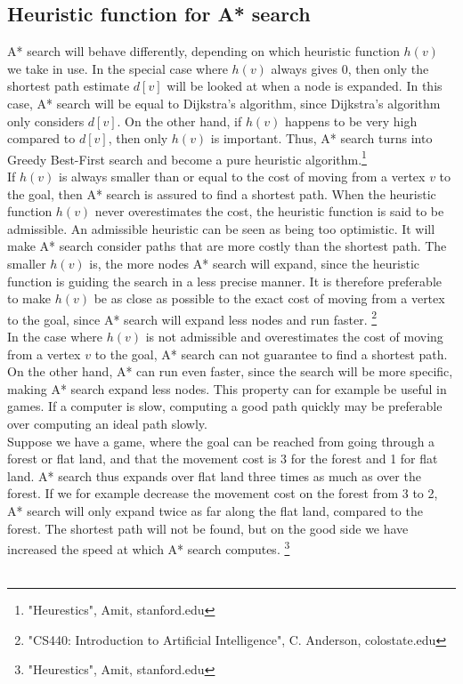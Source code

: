 \documentclass[11pt]{article}
\begin{document}
\subsection{Heuristic function for A* search}
A* search will behave differently, depending on which heuristic function $h(v)$ we take in use. In the special case where $h(v)$ always gives 0, then only the shortest path estimate $d[v]$ will be looked at when a node is expanded. In this case, A* search will be equal to Dijkstra's algorithm, since Dijkstra's algorithm only considers $d[v]$. On the other hand, if $h(v)$ happens to be very high compared to $d[v]$, then only $h(v)$ is important. Thus, A* search turns into Greedy Best-First search and become a pure heuristic algorithm.\footnote{"Heurestics", Amit, stanford.edu}\\

\noindent If $h(v)$ is always smaller than or equal to the cost of moving from a vertex $v$ to the goal, then A* search is assured to find a shortest path. When the  heuristic function $h(v)$ never overestimates the cost, the heuristic function is said to be admissible. An admissible heuristic can be seen as being too optimistic. It will make A* search consider paths that are more costly than the shortest path. The smaller $h(v)$ is, the more nodes A* search will expand, since the heuristic function is guiding the search in a less precise manner. It is therefore preferable to make $h(v)$ be as close as possible to the exact cost of moving from a vertex to the goal, since A* search will expand less nodes and run faster. \footnote{"CS440: Introduction to Artificial Intelligence", C. Anderson, colostate.edu}\\

\noindent In the case where $h(v)$ is not admissible and overestimates the cost of moving from a vertex $v$ to the goal, A* search can not guarantee to find a shortest path. On the other hand, A* can run even faster, since the search will be more specific, making A* search expand less nodes. This property can for example be useful in games. If a computer is slow, computing a good path quickly may be preferable over computing an ideal path slowly.\\

\noindent Suppose we have a game, where the goal can be reached from going through a forest or flat land, and that the movement cost is 3 for the forest and 1 for flat land. A* search thus expands over flat land three times as much as over the forest. If we for example decrease the movement cost on the forest from 3 to 2, A* search will only expand twice as far along the flat land, compared to the forest. The shortest path will not be found, but on the good side we have increased the speed at which A* search computes. \footnote{"Heurestics", Amit, stanford.edu}\\\\
\end{document}

